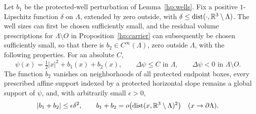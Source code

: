\begin{lemma}\label{qt:poisson}
Let $b_1$ be the protected-well perturbation of Lemma~\ref{hp:wells}.
Fix a positive $1$-Lipschitz function $\delta$ on $\Lambda$, extended by
zero outside, with $\delta\leq\operatorname{dist}(\cdot,\mathbb R^3\setminus\Lambda)$.
The well sizes can first be chosen sufficiently small, and the residual
volume prescriptions for $\Lambda\setminus O$ in
Proposition~\ref{hp:carrier} can subsequently be chosen sufficiently small,
so that there is $b_2\in C^\infty(\Lambda)$, zero outside $\Lambda$,
with the following properties.  For an absolute $C$,
\begin{equation}\label{qt:laplacian}
 \psi(x)=\tfrac12|x|^2+b_1(x)+b_2(x),\qquad
 \Delta\psi\leq C\text{ in }\Lambda,\qquad
 \Delta\psi<0\text{ in }\Lambda\setminus O.
\end{equation}
The function $b_2$ vanishes on neighborhoods of all protected endpoint
boxes, every prescribed affine support indexed by a protected
horizontal slope remains a global support of $\psi$, and, with
arbitrarily small $\epsilon>0$,
\begin{equation}\label{qt:potential-smallness}
 |b_1+b_2|\leq\epsilon\delta^2,\qquad
 b_1+b_2=o\bigl(\operatorname{dist}(x,\mathbb R^3\setminus\Lambda)^2\bigr)
 \quad(x\to\partial\Lambda).
\end{equation}
\end{lemma}


